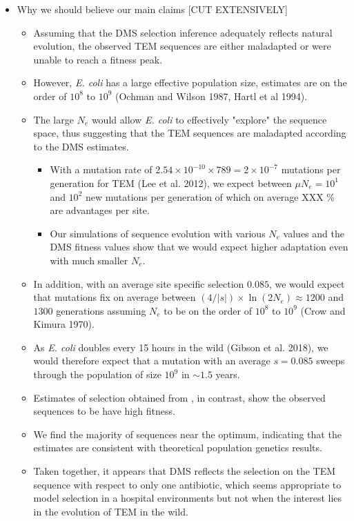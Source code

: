 \documentclass[12pt]{article}
\begin{document}
\begin{itemize}
\item Why we should believe our main claims [CUT EXTENSIVELY]
  \begin{itemize}
  \item Assuming that the DMS selection inference adequately reflects natural evolution, the observed TEM sequences are either maladapted or were unable to reach a fitness peak.
  \item However, \textit{E. coli} has a large effective population size, estimates are on the order of $10^8$ to $10^9$ (Ochman and Wilson 1987, Hartl et al 1994).
  \item The large $N_e$ would allow \textit{E. coli} to effectively "explore" the sequence space, thus suggesting that the TEM sequences are maladapted according to the DMS estimates.
    \begin{itemize}
    \item With a mutation rate of $2.54\times 10^{-10} \times 789 = 2\times 10^{-7}$ mutations per generation for TEM (Lee et al. 2012), we expect between $\mu N_e = 10^1$ and $10^2$ new mutations per generation of which on average XXX \% are advantages per site.
    \item Our simulations of sequence evolution with various $N_e$ values and the DMS fitness values show that we would expect higher adaptation even with much smaller $N_e$.
    \end{itemize}
  \item In addition, with an average site specific selection $0.085$, we would expect that mutations fix on average between $(4/|s|)\times \ln(2N_e) \approx 1200$ and $1300$ generations assuming $N_e$ to be on the order of $10^8$ to $10^9$ (Crow and Kimura 1970).
  \item As \textit{E. coli} doubles every 15 hours in the wild (Gibson et al. 2018), we would therefore expect that a mutation with an average $s = 0.085$ sweeps through the population of size $10^9$ in $\sim 1.5$ years.
  \end{itemize}
  \begin{itemize}
  \item Estimates of selection obtained from \selac, in contrast, show the observed sequences to be have high fitness.
    \begin{itemize}
    \end{itemize}
  \item We find the majority of sequences near the optimum, indicating that the \selac estimates are consistent with theoretical population genetics results.
  \item Taken together, it appears that DMS reflects the selection on the TEM sequence with respect to only one antibiotic, which seems appropriate to model selection in a hospital environments but not when the interest lies in the evolution of TEM in the wild.

\end{itemize}
\end{itemize}
\end{document}
